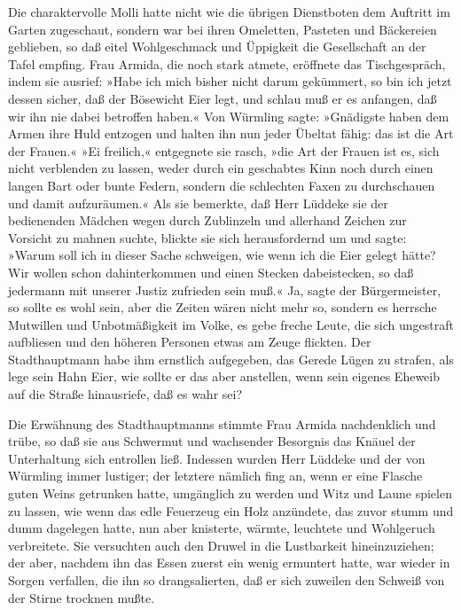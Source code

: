 Die charaktervolle Molli hatte nicht wie die übrigen Dienstboten
dem Auftritt im Garten zugeschaut, sondern war bei ihren Omeletten,
Pasteten und Bäckereien geblieben, so daß eitel Wohlgeschmack und
Üppigkeit die Gesellschaft an der Tafel empfing. Frau Armida, die
noch stark atmete, eröffnete das Tischgespräch, indem sie ausrief:
»Habe ich mich bisher nicht darum gekümmert, so bin ich jetzt
dessen sicher, daß der Bösewicht Eier legt, und schlau muß er es
anfangen, daß wir ihn nie dabei betroffen haben.« Von Würmling
sagte: »Gnädigste haben dem Armen ihre Huld entzogen und halten ihn
nun jeder Übeltat fähig: das ist die Art der Frauen.« »Ei
freilich,« entgegnete sie rasch, »die Art der Frauen ist es, sich
nicht verblenden zu lassen, weder durch ein geschabtes Kinn noch
durch einen langen Bart oder bunte Federn, sondern die schlechten
Faxen zu durchschauen und damit aufzuräumen.« Als sie bemerkte, daß
Herr Lüddeke sie der bedienenden Mädchen wegen durch Zublinzeln und
allerhand Zeichen zur Vorsicht zu mahnen suchte, blickte sie sich
herausfordernd um und sagte: »Warum soll ich in dieser Sache
schweigen, wie wenn ich die Eier gelegt hätte? Wir wollen schon
dahinterkommen und einen Stecken dabeistecken, so daß jedermann mit
unserer Justiz zufrieden sein muß.« Ja, sagte der Bürgermeister, so
sollte es wohl sein, aber die Zeiten wären nicht mehr so, sondern
es herrsche Mutwillen und Unbotmäßigkeit im Volke, es gebe freche
Leute, die sich ungestraft aufbliesen und den höheren Personen
etwas am Zeuge flickten. Der Stadthauptmann habe ihm ernstlich
aufgegeben, das Gerede Lügen\pagenum{[20]} zu strafen, als lege
sein Hahn Eier, wie sollte er das aber anstellen, wenn sein eigenes
Eheweib auf die Straße hinausriefe, daß es wahr sei?

Die Erwähnung des Stadthauptmanns stimmte Frau Armida nachdenklich
und trübe, so daß sie aus Schwermut und wachsender Besorgnis das
Knäuel der Unterhaltung sich entrollen ließ. Indessen wurden Herr
Lüddeke und der von Würmling immer lustiger; der letztere nämlich
fing an, wenn er eine Flasche guten Weins getrunken hatte,
umgänglich zu werden und Witz und Laune spielen zu lassen, wie wenn
das edle Feuerzeug ein Holz anzündete, das zuvor stumm und dumm
dagelegen hatte, nun aber knisterte, wärmte, leuchtete und
Wohlgeruch verbreitete. Sie versuchten auch den Druwel in die
Lustbarkeit hineinzuziehen; der aber, nachdem ihn das Essen zuerst
ein wenig ermuntert hatte, war wieder in Sorgen verfallen, die ihn
so drangsalierten, daß er sich zuweilen den Schweiß von der Stirne
trocknen mußte.

